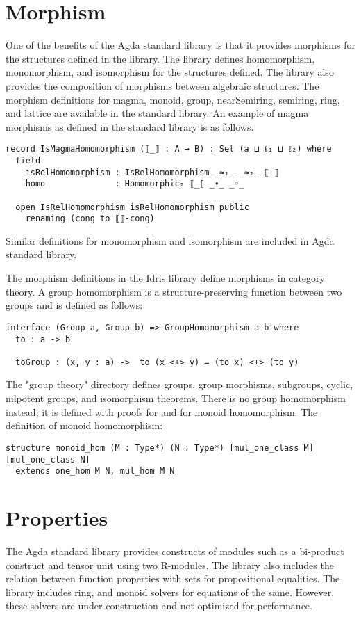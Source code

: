 \section{Morphism}
One of the benefits of the Agda standard library is that it provides morphisms
for the structures defined in the library. The library defines homomorphism,
monomorphism, and isomorphism for the structures defined. The library also provides
the composition of morphisms between algebraic structures. The morphism
definitions for magma, monoid, group, nearSemiring, semiring, ring, and lattice are
available in the standard library. An example of magma morphisms as defined in
the standard library is as follows.

\begin{verbatim}
record IsMagmaHomomorphism (⟦_⟧ : A → B) : Set (a ⊔ ℓ₁ ⊔ ℓ₂) where
  field
    isRelHomomorphism : IsRelHomomorphism _≈₁_ _≈₂_ ⟦_⟧
    homo              : Homomorphic₂ ⟦_⟧ _∙_ _◦_

  open IsRelHomomorphism isRelHomomorphism public
    renaming (cong to ⟦⟧-cong)
\end{verbatim}

Similar definitions for monomorphism and isomorphism are included in Agda
standard library. 

The morphism definitions in the Idris library define morphisms
in category theory. A group homomorphism is a structure-preserving function
between two groups and is defined as follows:


\begin{verbatim}
interface (Group a, Group b) => GroupHomomorphism a b where
  to : a -> b

  toGroup : (x, y : a) ->  to (x <+> y) = (to x) <+> (to y)

\end{verbatim}

The "group theory" directory defines groups, group morphisms, subgroups, cyclic,
nilpotent groups, and isomorphism theorems. There is no group homomorphism
instead, it is defined with proofs for  and  for
monoid homomorphism. The definition of monoid homomorphism:

\begin{verbatim}
structure monoid_hom (M : Type*) (N : Type*) [mul_one_class M] [mul_one_class N]
  extends one_hom M N, mul_hom M N
\end{verbatim}

\section{Properties}
The Agda standard library provides constructs of modules such as a bi-product
construct and tensor unit using two R-modules. The library also includes the
relation between function properties with  sets for propositional equalities.
The library includes ring, and monoid solvers for equations of the same.
However, these solvers are under construction and not optimized for performance.

